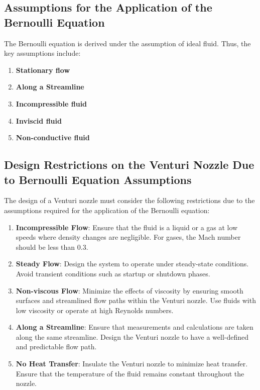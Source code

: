 \documentclass{article}
\begin{document}
\subsection{Assumptions for the Application of the Bernoulli Equation}

The Bernoulli equation is derived under the assumption of ideal fluid. Thus, the key assumptions include:

\begin{enumerate}
    \item \textbf{Stationary flow}
    \item \textbf{Along a Streamline}
    \item \textbf{Incompressible fluid}
    \item \textbf{Inviscid fluid}
    \item \textbf{Non-conductive fluid}
    
\end{enumerate}


\subsection{Design Restrictions on the Venturi Nozzle Due to Bernoulli Equation Assumptions}

The design of a Venturi nozzle must consider the following restrictions due to the assumptions required for the application of the Bernoulli equation:

\begin{enumerate}
    \item \textbf{Incompressible Flow}: Ensure that the fluid is a liquid or a gas at low speeds where density changes are negligible. For gases, the Mach number should be less than 0.3.

    \item \textbf{Steady Flow}: Design the system to operate under steady-state conditions. Avoid transient conditions such as startup or shutdown phases.

    \item \textbf{Non-viscous Flow}: Minimize the effects of viscosity by ensuring smooth surfaces and streamlined flow paths within the Venturi nozzle. Use fluids with low viscosity or operate at high Reynolds numbers.

    \item \textbf{Along a Streamline}: Ensure that measurements and calculations are taken along the same streamline. Design the Venturi nozzle to have a well-defined and predictable flow path.

    \item \textbf{No Heat Transfer}: Insulate the Venturi nozzle to minimize heat transfer. Ensure that the temperature of the fluid remains constant throughout the nozzle.
    
\end{enumerate}
\end{document}
